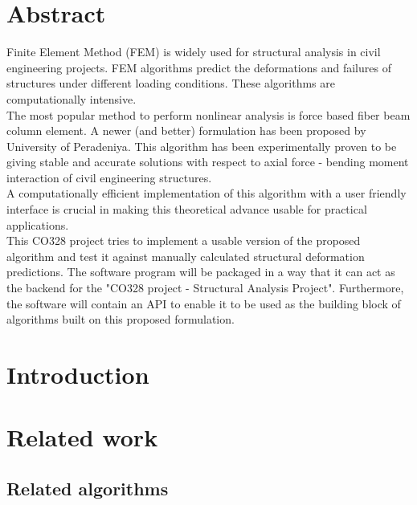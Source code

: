 \documentclass[12pt]{article}
\begin{document}

\tableofcontents
\pagebreak


\section{Abstract}
Finite Element Method (FEM) is widely used for structural analysis in civil engineering projects. FEM algorithms predict the deformations and failures of structures under different loading conditions. These algorithms are computationally intensive.\\
The most popular method to perform nonlinear analysis is force based fiber beam column element. A newer (and better) formulation has been proposed by University of Peradeniya\cite{chathura-paper}. This algorithm has been experimentally proven to be giving stable and accurate solutions with respect to axial force - bending moment interaction of civil engineering structures.\\
A computationally efficient implementation of this algorithm with a user friendly interface is crucial in making this theoretical advance usable for practical applications.\\ 
This CO328 project tries to implement a usable version of the proposed algorithm and test it against manually calculated structural deformation predictions. The software program will be packaged in a way that it can act as the backend for the "CO328 project - Structural Analysis Project". Furthermore, the software will contain an API to enable it to be used as the building block of algorithms built on this proposed formulation.\\
\section{Introduction}

\section{Related work}

\subsection{Related algorithms}
\end{document}
